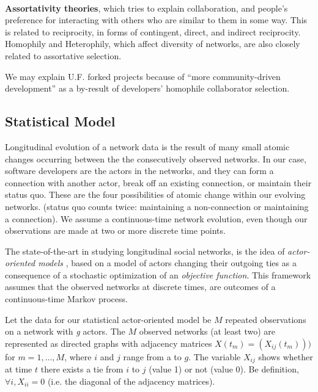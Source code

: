 \documentclass[11pt]{report}
\begin{document}
\paragraph{} \textbf{Assortativity theories}, which tries to explain collaboration, and people's preference for interacting with others who are similar to them in some way. This is related to reciprocity, in forms of contingent, direct, and indirect reciprocity. Homophily and Heterophily, which affect diversity of networks, are also closely related to assortative selection.

We may explain U.F. forked projects because of ``more community-driven development'' as a by-result of developers' homophile collaborator selection.


\subsection{Statistical Model}
\label{statisticalModel}

Longitudinal evolution of a network data is the result of many small atomic changes occurring between the the consecutively observed networks. In our case, software developers are the actors in the networks, and they can form a connection with another actor, break off an existing connection, or maintain their status quo. These are the four possibilities of atomic change within our evolving networks. (status quo counts twice: maintaining a non-connection or maintaining a connection). We assume a continuous-time network evolution, even though our observations are made at two or more discrete time points. 

The state-of-the-art in studying longitudinal social networks, is the idea of \textit{actor-oriented models} \cite{Snijders2010}, based on a model of actors changing their outgoing ties as a consequence of a stochastic optimization of an \textit{objective function}. This framework assumes that the observed networks at discrete times, are outcomes of a continuous-time Markov process.

Let the data for our statistical actor-oriented model be $M$ repeated observations on a network with \textit{g} actors. The $M$ observed networks (at least two) are represented as directed graphs with adjacency matrices $X(t_m) = (X_{ij}(t_m)))$ for $m = 1,...,M$, where $i$ and $j$ range from a to $g$. The variable $X_{ij}$ shows whether at time $t$ there exists a tie from $i$ to $j$ (value 1) or not (value 0). Be definition, $\forall i, X_{ii}=0$ (i.e. the diagonal of the adjacency matrices).
\end{document}
